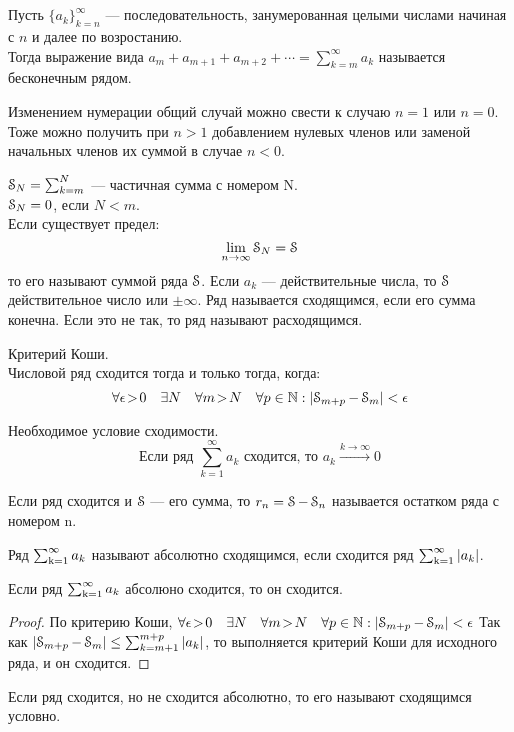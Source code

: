 \chapter{}
\begin{deff}
Пусть $ \{a_k \}_{k=n}^{\infty} $ --- последовательность, занумерованная целыми числами начиная с $ n $ и далее по возростанию.\\
Тогда выражение вида $a_m+a_{m+1}+a_{m+2}+ \cdots = \sum_{k=m}^{\infty} a_k$ называется бесконечным рядом.\\
\end{deff}
Изменением нумерации общий случай можно свести к случаю $n=1$ или $n=0$.
Тоже можно получить при $n>1$ добавлением нулевых членов или заменой начальных членов их суммой в случае $n<0$.
\begin{deff}
$ \operatorname{\EuScript{S}}_{N} = \sum_{k=m}^{N} $ --- частичная сумма с номером N.\\
$ \operatorname{\EuScript{S}}_{N} = 0 $, если $ N < m $.\\
Если существует предел:
$$ \lim_{n \to \infty} {\operatorname{\EuScript{S}}_N} = \operatorname{\EuScript{S}} $$
то его называют суммой ряда $\operatorname{\EuScript{S}}$. Если $a_k$ --- действительные числа, то $\operatorname{\EuScript{S}}$ действительное число или $\pm \infty$.
Ряд называется сходящимся, если его сумма конечна. 
Если это не так, то ряд называют расходящимся.
\end{deff}
\begin{st}Критерий Коши.\\
Числовой ряд сходится тогда и только тогда, когда:
$$ \forall{\epsilon\!>\! 0} \quad \exists N \quad \forall m \! >\! N \quad \forall p \in \operatorname{\mathbb{N}} : \left| \operatorname{\EuScript{S}}_{m+p} - \operatorname{\EuScript{S}}_m \right| < \epsilon$$ 
\end{st}
\begin{st}Необходимое условие сходимости.\\
$$ \mbox{Если ряд } \sum_{k=1}^{\infty} a_k \mbox{ сходится, то } a_k \xrightarrow{k\to\infty}0$$
\end{st}
\begin{deff}
Если ряд сходится и $\operatorname{\EuScript{S}}$ --- его сумма, то $r_n = \operatorname{\EuScript{S}} - \operatorname{\EuScript{S}}_n$ называется остатком ряда с номером n.%
\end{deff}
\begin{deff}
Ряд $\operatorname{\sum_{k=1}^{\infty}} a_k $ называют абсолютно сходящимся, если сходится ряд $\operatorname{\sum_{k=1}^{\infty}} |a_k| $.
\end{deff}
\begin{thm}
Если ряд $\operatorname{\sum_{k=1}^{\infty}} a_k$ абсолюно сходится, то он сходится.
\end{thm}
\begin{proof}
По критерию Коши, $ \forall{\epsilon\!>\! 0} \quad \exists N \quad \forall m \! >\! N \quad \forall p \in \operatorname{\mathbb{N}} : \left| \operatorname{\EuScript{S}}_{m+p} - \operatorname{\EuScript{S}}_m \right| < \epsilon$
Так как $\left| \operatorname{\EuScript{S}}_{m+p} - \operatorname{\EuScript{S}}_m \right| \le \sum_{k=m+1}^{m+p}|a_k|$, то выполняется критерий Коши для исходного ряда, и он сходится.
\end{proof}
\begin{deff}
Если ряд сходится, но не сходится абсолютно, то его называют сходящимся условно.
\end{deff}
